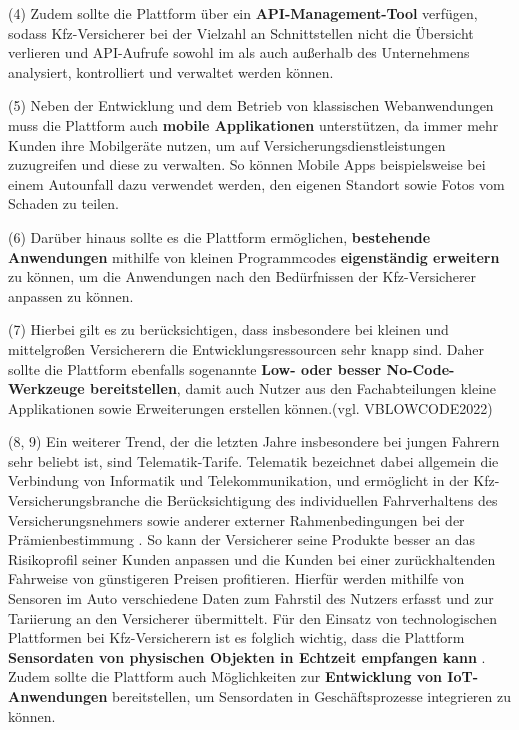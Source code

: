 (4) Zudem sollte die Plattform über ein \textbf{API-Management-Tool} verfügen, sodass Kfz-Versicherer bei der Vielzahl an Schnittstellen nicht die Übersicht verlieren und API-Aufrufe sowohl im als auch außerhalb des Unternehmens analysiert, kontrolliert und verwaltet werden können. \autocite[Vgl.][S. 67ff]{HANSCHKE2021}

(5) Neben der Entwicklung und dem Betrieb von klassischen Webanwendungen muss die Plattform auch \textbf{mobile Applikationen} unterstützen, da immer mehr Kunden ihre Mobilgeräte nutzen, um auf Versicherungsdienstleistungen zuzugreifen und diese zu verwalten. So können Mobile Apps beispielsweise bei einem Autounfall dazu verwendet werden, den eigenen Standort sowie Fotos vom Schaden zu teilen. \autocite[Vgl.][S. 7]{HU2020}

(6) Darüber hinaus sollte es die Plattform ermöglichen, \textbf{bestehende Anwendungen} mithilfe von kleinen Programmcodes \textbf{eigenständig erweitern} zu können, um die Anwendungen nach den Bedürfnissen der Kfz-Versicherer anpassen zu können. \autocite[Vgl.][]{WEINGARTNER2023}

(7) Hierbei gilt es zu berücksichtigen, dass insbesondere bei kleinen und mittelgroßen Versicherern die Entwicklungsressourcen sehr knapp sind. Daher sollte die Plattform ebenfalls sogenannte \textbf{Low- oder besser No-Code-Werkzeuge bereitstellen}, damit auch Nutzer aus den Fachabteilungen kleine Applikationen sowie Erweiterungen erstellen können.(vgl. VBLOWCODE2022) \autocite[Vgl.][]{VBLOWCODE2022}

(8, 9) Ein weiterer Trend, der die letzten Jahre insbesondere bei jungen Fahrern sehr beliebt ist, sind Telematik-Tarife. Telematik bezeichnet dabei allgemein die Verbindung von Informatik und Telekommunikation, \autocite[Vgl.][S. 10-11]{ABTS2017} und ermöglicht in der Kfz-Versicherungsbranche die Berücksichtigung des individuellen Fahrverhaltens des Versicherungsnehmers sowie anderer externer Rahmenbedingungen bei der Prämienbestimmung \autocite[Vgl.][S. 84]{MERZINGER2017}. So kann der Versicherer seine Produkte besser an das Risikoprofil seiner Kunden anpassen und die Kunden bei einer zurückhaltenden Fahrweise von günstigeren Preisen profitieren. Hierfür werden mithilfe von Sensoren im Auto verschiedene Daten zum Fahrstil des Nutzers erfasst und zur Tariierung an den Versicherer übermittelt. \autocite[Vgl.][S. 3-4]{ELING2020} Für den Einsatz von technologischen Plattformen bei Kfz-Versicherern ist es folglich wichtig, dass die Plattform \textbf{Sensordaten von physischen Objekten in Echtzeit empfangen kann} \autocite[Vgl.][S. 10-15]{WEICHERT2015}. Zudem sollte die Plattform auch Möglichkeiten zur \textbf{Entwicklung von IoT-Anwendungen} bereitstellen, um Sensordaten in Geschäftsprozesse integrieren zu können. 

